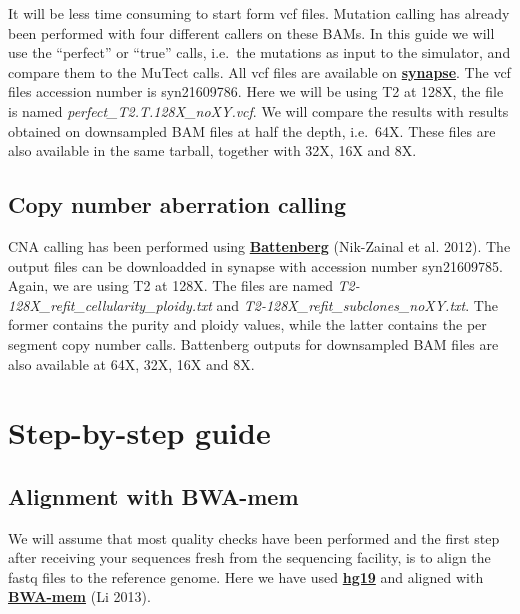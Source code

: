 \documentclass[]{article}
\begin{document}
It will be less time consuming to start form vcf files. Mutation calling
has already been performed with four different callers on these BAMs. In
this guide we will use the ``perfect'' or ``true'' calls, i.e.~the
mutations as input to the simulator, and compare them to the MuTect
calls. All vcf files are available on
\href{https://www.synapse.org/\#!Synapse:syn2813581/wiki/303137}{\textbf{synapse}}.
The vcf files accession number is syn21609786. Here we will be using T2
at 128X, the file is named \emph{perfect\_T2.T.128X\_noXY.vcf}. We will
compare the results with results obtained on downsampled BAM files at
half the depth, i.e.~64X. These files are also available in the same
tarball, together with 32X, 16X and 8X.

\hypertarget{copy-number-aberration-calling}{%
\subsection{Copy number aberration
calling}\label{copy-number-aberration-calling}}

CNA calling has been performed using
\href{https://github.com/Wedge-Oxford/battenberg}{\textbf{Battenberg}}
(Nik-Zainal et al. 2012). The output files can be downloadded in synapse
with accession number syn21609785. Again, we are using T2 at 128X. The
files are named \emph{T2-128X\_refit\_cellularity\_ploidy.txt} and
\emph{T2-128X\_refit\_subclones\_noXY.txt}. The former contains the
purity and ploidy values, while the latter contains the per segment copy
number calls. Battenberg outputs for downsampled BAM files are also
available at 64X, 32X, 16X and 8X.

\newpage

\hypertarget{step-by-step-guide}{%
\section{Step-by-step guide}\label{step-by-step-guide}}

\hypertarget{alignment-with-bwa-mem}{%
\subsection{Alignment with BWA-mem}\label{alignment-with-bwa-mem}}

We will assume that most quality checks have been performed and the
first step after receiving your sequences fresh from the sequencing
facility, is to align the fastq files to the reference genome. Here we
have used
\href{http://ftp.1000genomes.ebi.ac.uk/vol1/ftp/technical/reference/phase2_reference_assembly_sequence/hs37d5.fa.gz}{\textbf{hg19}}
and aligned with \href{https://github.com/lh3/bwa}{\textbf{BWA-mem}} (Li
2013).
\end{document}
